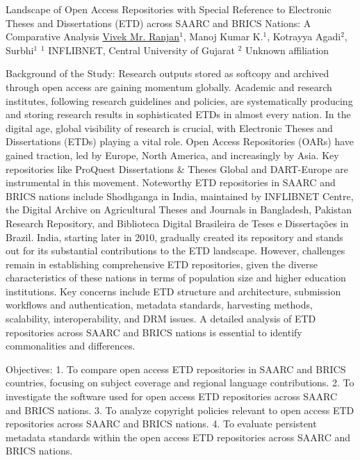 \begin{abstract_online}{Landscape of Open Access Repositories with Special Reference to Electronic Theses and Dissertations (ETD) across SAARC and BRICS Nations: A Comparative Analysis}{%
    \underline{Vivek Mr. Ranjan}$^{1}$, Manoj Kumar K.$^{1}$, Kotrayya Agadi$^{2}$, Surbhi$^{1}$}{%
    $^1$ INFLIBNET, Central University of Gujarat\newline%
    $^2$ Unknown affiliation%
}

Background of the Study: Research outputs stored as softcopy and archived through open access are gaining momentum globally. Academic and research institutes, following research guidelines and policies, are systematically producing and storing research results in sophisticated ETDs in almost every nation. In the digital age, global visibility of research is crucial, with Electronic Theses and Dissertations (ETDs) playing a vital role. Open Access Repositories (OARs) have gained traction, led by Europe, North America, and increasingly by Asia. Key repositories like ProQuest Dissertations \& Theses Global and DART-Europe are instrumental in this movement. Noteworthy ETD repositories in SAARC and BRICS nations include Shodhganga in India, maintained by INFLIBNET Centre, the Digital Archive on Agricultural Theses and Journals in Bangladesh, Pakistan Research Repository, and Biblioteca Digital Brasileira de Teses e Dissertações in Brazil. India, starting later in 2010, gradually created its repository and stands out for its substantial contributions to the ETD landscape. However, challenges remain in establishing comprehensive ETD repositories, given the diverse characteristics of these nations in terms of population size and higher education institutions. Key concerns include ETD structure and architecture, submission workflows and authentication, metadata standards, harvesting methods, scalability, interoperability, and DRM issues. A detailed analysis of ETD repositories across SAARC and BRICS nations is essential to identify commonalities and differences.

Objectives:
1. To compare open access ETD repositories in SAARC and BRICS countries, focusing on subject coverage and regional language contributions.
2. To investigate the software used for open access ETD repositories across SAARC and BRICS nations.
3. To analyze copyright policies relevant to open access ETD repositories across SAARC and BRICS nations.
4. To evaluate persistent metadata standards within the open access ETD repositories across SAARC and BRICS nations.


\end{abstract_online}
